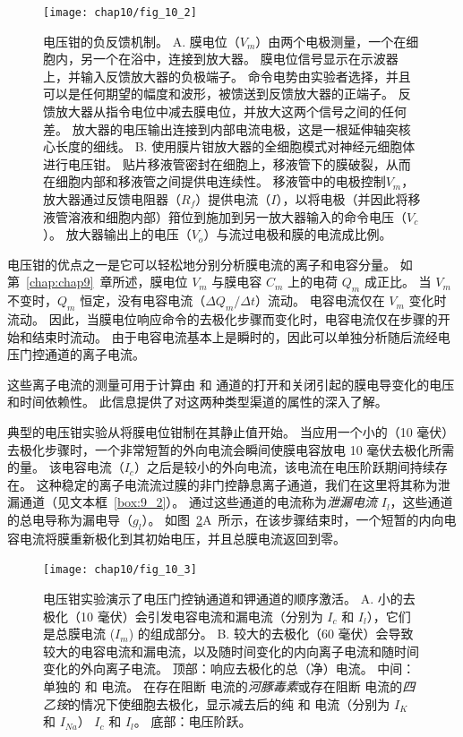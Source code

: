 \begin{figure}[htbp]
	\centering
	\texttt{[image: chap10/fig\_10\_2]}
	\caption{电压钳的负反馈机制。
	A. 膜电位（$V_m$）由两个电极测量，一个在细胞内，另一个在浴中，连接到放大器。
	膜电位信号显示在示波器上，并输入反馈放大器的负极端子。
	命令电势由实验者选择，并且可以是任何期望的幅度和波形，被馈送到反馈放大器的正端子。
	反馈放大器从指令电位中减去膜电位，并放大这两个信号之间的任何差。
	放大器的电压输出连接到内部电流电极，这是一根延伸轴突核心长度的细线。
	B. 使用膜片钳放大器的全细胞模式对神经元细胞体进行电压钳。
	贴片移液管密封在细胞上，移液管下的膜破裂，从而在细胞内部和移液管之间提供电连续性。
	移液管中的电极控制$V_m$，放大器通过反馈电阻器（$R_f$）提供电流（$I$），以将电极（并因此将移液管溶液和细胞内部）箝位到施加到另一放大器输入的命令电压（$V_c$）。
	放大器输出上的电压（$V_o$）与流过电极和膜的电流成比例。}
	\label{fig:10_2}
\end{figure}



电压钳的优点之一是它可以轻松地分别分析膜电流的离子和电容分量。
如第~\ref{chap:chap9}~章所述，膜电位 $V_m$ 与膜电容 $C_m$ 上的电荷 $Q_m$ 成正比。
当 $V_m$ 不变时，$Q_m$ 恒定，没有电容电流（$\Delta Q_m / \Delta t）$流动。
电容电流仅在 $V_m$ 变化时流动。
因此，当膜电位响应命令的去极化步骤而变化时，电容电流仅在步骤的开始和结束时流动。
由于电容电流基本上是瞬时的，因此可以单独分析随后流经电压门控通道的离子电流。


这些离子电流的测量可用于计算由  和  通道的打开和关闭引起的膜电导变化的电压和时间依赖性。
此信息提供了对这两种类型渠道的属性的深入了解。


典型的电压钳实验从将膜电位钳制在其静止值开始。
当应用一个小的（10 毫伏）去极化步骤时，一个非常短暂的外向电流会瞬间使膜电容放电 10 毫伏去极化所需的量。
该电容电流（$I_c$）之后是较小的外向电流，该电流在电压阶跃期间持续存在。
这种稳定的离子电流流过膜的非门控静息离子通道，我们在这里将其称为泄漏通道（见文本框~\ref{box:9_2}）。
通过这些通道的电流称为\textit{泄漏电流} $I_l$，这些通道的总电导称为漏电导（$g_l$）。
如图~\ref{fig:10_3}A~所示，在该步骤结束时，一个短暂的内向电容电流将膜重新极化到其初始电压，并且总膜电流返回到零。


\begin{figure}[htbp]
	\centering
	\texttt{[image: chap10/fig\_10\_3]}
	\caption{电压钳实验演示了电压门控钠通道和钾通道的顺序激活。 
		A. 小的去极化（10 毫伏）会引发电容电流和漏电流（分别为 $I_c$ 和 $I_l$），它们是总膜电流 ($I_m$) 的组成部分。
		B. 较大的去极化（60 毫伏）会导致较大的电容电流和漏电流，以及随时间变化的内向离子电流和随时间变化的外向离子电流。
		顶部：响应去极化的总（净）电流。
		中间：单独的  和  电流。
		在存在阻断  电流的\textit{河豚毒素}或存在阻断  电流的\textit{四乙铵}的情况下使细胞去极化，显示减去后的纯  和  电流（分别为 $I_K$ 和 $I_{Na}$） $I_c$ 和 $I_l$。
		底部：电压阶跃。}
	\label{fig:10_3}
\end{figure}


